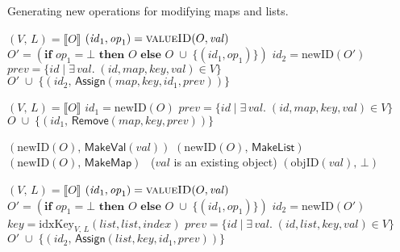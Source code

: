 \begin{algorithm}[t]
\caption{Generating new operations for modifying maps and lists.}\label{fig:pseudocode}
\noindent
\renewcommand\algorithmicindent{10pt}
\begin{minipage}[t]{0.5\textwidth}
\begin{algorithmic}
    \State $(V,\, L) = \llbracket O \rrbracket$
    \State $(\mathit{id}_1, \mathit{op}_1) = \Call{valueID}{O, \mathit{val}}$
    \State $O' = (\textbf{if } \mathit{op}_1 = \bot \textbf{ then } O \textbf{ else } 
        O \;\cup\; \big\{ (\mathit{id}_1, \mathit{op}_1) \big\})$
    \State $\mathit{id}_2 = \mathrm{newID}(O')$
    \State $\mathit{prev} = \{ \mathit{id} \mid \exists\,\mathit{val}.\; (\mathit{id}, \mathit{map}, \mathit{key}, \mathit{val}) \in V \}$
    \State \Return $O' \;\cup\; \big\{ (\mathit{id}_2,\, \mathsf{Assign}(\mathit{map}, \mathit{key}, \mathit{id}_1, \mathit{prev})) \big\}$
    \EndFunction\Statex

    \State $(V,\, L) = \llbracket O \rrbracket$
    \State $\mathit{id}_1 = \mathrm{newID}(O)$
    \State $\mathit{prev} = \{ \mathit{id} \mid \exists\,\mathit{val}.\; (\mathit{id}, \mathit{map}, \mathit{key}, \mathit{val}) \in V \}$
    \State \Return $O \;\cup\; \big\{ (\mathit{id}_1,\, \mathsf{Remove}(\mathit{map}, \mathit{key}, \mathit{prev})) \big\}$
    \EndFunction\Statex

    \State \Return $(\mathrm{newID}(O),\, \mathsf{MakeVal}(\mathit{val}))$
    \State \Return $(\mathrm{newID}(O),\, \mathsf{MakeList})$
    \State \Return $(\mathrm{newID}(O),\, \mathsf{MakeMap})$
    \Else ~($\mathit{val}$ is an existing object)
    \State \Return $(\mathrm{objID}(\mathit{val}),\, \bot)$
    \EndIf
    \EndFunction
\end{algorithmic}
\end{minipage}%
\begin{minipage}[t]{0.5\textwidth}
\begin{algorithmic}
    \State $(V,\, L) = \llbracket O \rrbracket$
    \State $(\mathit{id}_1, \mathit{op}_1) = \Call{valueID}{O, \mathit{val}}$
    \State $O' = (\textbf{if } \mathit{op}_1 = \bot \textbf{ then } O \textbf{ else } 
        O \;\cup\; \big\{ (\mathit{id}_1, \mathit{op}_1) \big\})$
    \State $\mathit{id}_2 = \mathrm{newID}(O')$
    \State $\mathit{key} = \mathrm{idxKey}_{V,\, L}(\mathit{list}, \mathit{list}, \mathit{index})$
    \State $\mathit{prev} = \{ \mathit{id} \mid \exists\,\mathit{val}.\; (\mathit{id}, \mathit{list}, \mathit{key}, \mathit{val}) \in V \}$
    \State \Return $O' \;\cup\; \big\{ (\mathit{id}_2,\, \mathsf{Assign}(\mathit{list}, \mathit{key}, \mathit{id}_1, \mathit{prev})) \big\}$
    \EndFunction\Statex


\end{algorithmic}
\end{minipage}
\end{algorithm}
